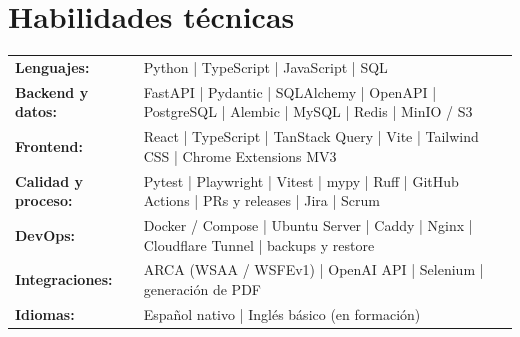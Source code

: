 \documentclass[letterpaper,10pt]{article}
\begin{document}
\section{Habilidades técnicas}
\vspace{2pt}
\begin{tabularx}{\textwidth}{@{}>{\bfseries}p{}X@{}}
Lenguajes: & Python | TypeScript | JavaScript | SQL \\
Backend y datos: & FastAPI | Pydantic | SQLAlchemy | OpenAPI | PostgreSQL | Alembic | MySQL | Redis | MinIO / S3 \\
Frontend: & React | TypeScript | TanStack Query | Vite | Tailwind CSS | Chrome Extensions MV3 \\
Calidad y proceso: & Pytest | Playwright | Vitest | mypy | Ruff | GitHub Actions | PRs y releases | Jira | Scrum \\
DevOps: & Docker / Compose | Ubuntu Server | Caddy | Nginx | Cloudflare Tunnel | backups y restore \\
Integraciones: & ARCA (WSAA / WSFEv1) | OpenAI API | Selenium | generación de PDF \\
Idiomas: & Español nativo | Inglés básico (en formación) \\
\end{tabularx}
\end{document}
